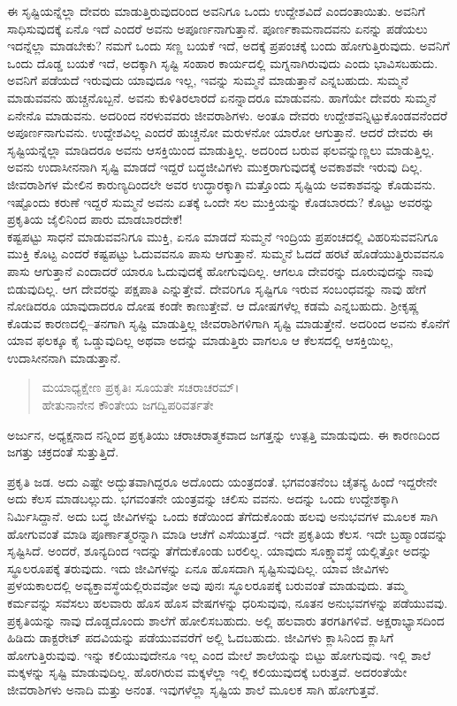 ಈ ಸೃಷ್ಟಿಯನ್ನೆಲ್ಲಾ ದೇವರು ಮಾಡುತ್ತಿರುವುದರಿಂದ ಅವನಿಗೂ ಒಂದು ಉದ್ದೇಶವಿದೆ ಎಂದಂತಾಯಿತು. ಅವನಿಗೆ ಸಾಧಿಸುವುದಕ್ಕೆ ಏನೊ ಇದೆ ಎಂದರೆ ಅವನು ಅಪೂರ್ಣನಾಗುತ್ತಾನೆ. ಪೂರ್ಣಕಾಮನಾದವನು ಏನನ್ನು ಪಡೆಯಲು ಇದನ್ನೆಲ್ಲಾ ಮಾಡಬೇಕು? ನಮಗೆ ಒಂದು ಸಣ್ಣ ಬಯಕೆ ಇದೆ, ಅದಕ್ಕೆ ಪ್ರಪಂಚಕ್ಕೆ ಬಂದು ಹೋಗುತ್ತಿರುವುದು. ಅವನಿಗೆ ಒಂದು ದೊಡ್ಡ ಬಯಕೆ ಇದೆ, ಅದಕ್ಕಾಗಿ ಸೃಷ್ಟಿ ಸಂಹಾರ ಕಾರ್ಯದಲ್ಲಿ ಮಗ್ನನಾಗಿರುವುದು ಎಂದು ಭಾವಿಸಬಹುದು. ಅವನಿಗೆ ಪಡೆಯದೆ ಇರುವುದು ಯಾವುದೂ ಇಲ್ಲ, ಇವನ್ನು ಸುಮ್ಮನೆ ಮಾಡುತ್ತಾನೆ ಎನ್ನಬಹುದು. ಸುಮ್ಮನೆ ಮಾಡುವವನು ಹುಚ್ಚನೊಬ್ಬನೆ. ಅವನು ಕುಳಿತಿರಲಾರದೆ ಏನನ್ನಾದರೂ ಮಾಡುವನು. ಹಾಗೆಯೇ ದೇವರು ಸುಮ್ಮನೆ ಏನೇನೊ ಮಾಡುವನು. ಅದರಿಂದ ನರಳುವವರು ಜೀವರಾಶಿಗಳು. ಅಂತೂ ದೇವರು ಉದ್ದೇಶವನ್ನಿಟ್ಟುಕೊಂಡವನೆಂದರೆ ಅಪೂರ್ಣನಾಗುವನು. ಉದ್ದೇಶವಿಲ್ಲ ಎಂದರೆ ಹುಚ್ಚನೋ ಮರುಳನೋ ಯಾರೋ ಆಗುತ್ತಾನೆ. ಆದರೆ ದೇವರು ಈ ಸೃಷ್ಟಿಯನ್ನೆಲ್ಲಾ ಮಾಡಿದರೂ ಅವನು ಆಸಕ್ತಿಯಿಂದ ಮಾಡುತ್ತಿಲ್ಲ. ಅದರಿಂದ ಬರುವ ಫಲವನ್ನುಣ್ಣಲು ಮಾಡುತ್ತಿಲ್ಲ. ಅವನು ಉದಾಸೀನನಾಗಿ ಸೃಷ್ಟಿ ಮಾಡದೆ ಇದ್ದರೆ ಬದ್ಧಜೀವಿಗಳು ಮುಕ್ತರಾಗುವುದಕ್ಕೆ ಅವಕಾಶವೇ ಇರುವು ದಿಲ್ಲ. ಜೀವರಾಶಿಗಳ ಮೇಲಿನ ಕಾರುಣ್ಯದಿಂದಲೇ ಅವರ ಉದ್ಧಾರಕ್ಕಾಗಿ ಮತ್ತೊಂದು ಸೃಷ್ಟಿಯ ಅವಕಾಶವನ್ನು ಕೊಡುವನು. ಇಷ್ಟೊಂದು ಕರುಣೆ ಇದ್ದರೆ ಸುಮ್ಮನೆ ಅವನು ಏತಕ್ಕೆ ಒಂದೇ ಸಲ ಮುಕ್ತಿಯನ್ನು ಕೊಡಬಾರದು? ಕೊಟ್ಟು ಅವರನ್ನು ಪ್ರಕೃತಿಯ ಜೈಲಿನಿಂದ ಪಾರು ಮಾಡಬಾರದೇಕೆ!\\ಕಷ್ಟಪಟ್ಟು ಸಾಧನೆ ಮಾಡುವವನಿಗೂ ಮುಕ್ತಿ, ಏನೂ ಮಾಡದೆ ಸುಮ್ಮನೆ ಇಂದ್ರಿಯ ಪ್ರಪಂಚದಲ್ಲಿ ವಿಹರಿಸುವವನಿಗೂ ಮುಕ್ತಿ ಕೊಟ್ಟ ಎಂದರೆ ಕಷ್ಟಪಟ್ಟು ಓದುವವನೂ ಪಾಸು ಆಗುತ್ತಾನೆ. ಸುಮ್ಮನೆ ಓದದೆ ಹರಟೆ ಹೊಡೆಯುತ್ತಿರುವವನೂ ಪಾಸು ಆಗುತ್ತಾನೆ ಎಂದಾದರೆ ಯಾರೂ ಓದುವುದಕ್ಕೆ ಹೋಗುವುದಿಲ್ಲ. ಆಗಲೂ ದೇವರನ್ನು ದೂರುವುದನ್ನು ನಾವು ಬಿಡುವುದಿಲ್ಲ. ಆಗ ದೇವರನ್ನು ಪಕ್ಷಪಾತಿ ಎನ್ನುತ್ತೇವೆ. ದೇವರಿಗೂ ಸೃಷ್ಟಿಗೂ ಇರುವ ಸಂಬಂಧವನ್ನು ನಾವು ಹೇಗೆ ನೋಡಿದರೂ ಯಾವುದಾದರೂ ದೋಷ ಕಂಡೇ ಕಾಣುತ್ತೇವೆ. ಆ ದೋಷಗಳೆಲ್ಲ ಕಡಮೆ ಎನ್ನಬಹುದು. ಶ್ರೀಕೃಷ್ಣ ಕೊಡುವ ಕಾರಣದಲ್ಲಿ–ತನಗಾಗಿ ಸೃಷ್ಟಿ ಮಾಡುತ್ತಿಲ್ಲ ಜೀವರಾಶಿಗಳಿಗಾಗಿ ಸೃಷ್ಟಿ ಮಾಡುತ್ತೇನೆ. ಅದರಿಂದ ಅವನು ಕೊನೆಗೆ ಯಾವ ಫಲಕ್ಕೂ ಕೈ ಒಡ್ಡುವುದಿಲ್ಲ ಅಥವಾ ಅದನ್ನು ಮಾಡುತ್ತಿರು ವಾಗಲೂ ಆ ಕೆಲಸದಲ್ಲಿ ಆಸಕ್ತಿಯಿಲ್ಲ, ಉದಾಸೀನನಾಗಿ ಮಾಡುತ್ತಾನೆ.

\begin{verse}
ಮಯಾಧ್ಯಕ್ಷೇಣ ಪ್ರಕೃತಿಃ ಸೂಯತೇ ಸಚರಾಚರಮ್​।\\ಹೇತುನಾನೇನ ಕೌಂತೇಯ ಜಗದ್ವಿಪರಿವರ್ತತೇ 
\end{verse}

{\small ಅರ್ಜುನ, ಅಧ್ಯಕ್ಷನಾದ ನನ್ನಿಂದ ಪ್ರಕೃತಿಯು ಚರಾಚರಾತ್ಮಕವಾದ ಜಗತ್ತನ್ನು ಉತ್ಪತ್ತಿ ಮಾಡುವುದು. ಈ ಕಾರಣದಿಂದ ಜಗತ್ತು ಚಕ್ರದಂತೆ ಸುತ್ತುತ್ತಿದೆ.}

ಪ್ರಕೃತಿ ಜಡ. ಅದು ಎಷ್ಟೇ ಅದ್ಭುತವಾಗಿದ್ದರೂ ಅದೊಂದು ಯಂತ್ರದಂತೆ. ಭಗವಂತನೆಂಬ ಚೈತನ್ಯ ಹಿಂದೆ ಇದ್ದರೇನೇ ಅದು ಕೆಲಸ ಮಾಡಬಲ್ಲುದು. ಭಗವಂತನೇ ಯಂತ್ರವನ್ನು ಚಲಿಸು ವವನು. ಅದನ್ನು ಒಂದು ಉದ್ದೇಶಕ್ಕಾಗಿ ನಿರ್ಮಿಸಿದ್ದಾನೆ. ಅದು ಬದ್ಧ ಜೀವಿಗಳನ್ನು ಒಂದು ಕಡೆಯಿಂದ ತೆಗೆದುಕೊಂಡು ಹಲವು ಅನುಭವಗಳ ಮೂಲಕ ಸಾಗಿ ಹೋಗುವಂತೆ ಮಾಡಿ ಪೂರ್ಣಾತ್ಮರನ್ನಾಗಿ ಮಾಡಿ ಆಚೆಗೆ ಎಸೆಯುತ್ತದೆ. ಇದೇ ಪ್ರಕೃತಿಯ ಕೆಲಸ. ಇದೇ ಬ್ರಹ್ಮಾಂಡವನ್ನು ಸೃಷ್ಟಿಸಿದೆ. ಅಂದರೆ, ಶೂನ್ಯದಿಂದ ಇದನ್ನು ತೆಗೆದುಕೊಂಡು ಬರಲಿಲ್ಲ. ಯಾವುದು ಸೂಕ್ಷ್ಮಾವಸ್ಥೆ ಯಲ್ಲಿತ್ತೋ ಅದನ್ನು ಸ್ಥೂಲರೂಪಕ್ಕೆ ತರುವುದು. ಇದು ಜೀವಿಗಳನ್ನು ಏನೂ ಹೊಸದಾಗಿ ಸೃಷ್ಟಿಸುವುದಿಲ್ಲ. ಯಾವ ಜೀವಿಗಳು ಪ್ರಳಯಕಾಲದಲ್ಲಿ ಅವ್ಯಕ್ತಾವಸ್ಥೆಯಲ್ಲಿರುವವೋ ಅವು ಪುನಃ ಸ್ಥೂಲರೂಪಕ್ಕೆ ಬರುವಂತೆ ಮಾಡುವುದು. ತಮ್ಮ ಕರ್ಮವನ್ನು ಸವೆಸಲು ಹಲವಾರು ಹೊಸ ಹೊಸ ವೇಷಗಳನ್ನು ಧರಿಸುವುವು, ನೂತನ ಅನುಭವಗಳನ್ನು ಪಡೆಯುವವು. ಪ್ರಕೃತಿಯನ್ನು ನಾವು ದೊಡ್ಡದೊಂದು ಶಾಲೆಗೆ ಹೋಲಿಸಬಹುದು. ಅಲ್ಲಿ ಹಲವಾರು ತರಗತಿಗಳಿವೆ. ಅಕ್ಷರಾಭ್ಯಾಸದಿಂದ ಹಿಡಿದು ಡಾಕ್ಟರೇಟ್ ಪದವಿಯನ್ನು ಪಡೆಯುವವರೆಗೆ ಅಲ್ಲಿ ಓದಬಹುದು. ಜೀವಿಗಳು ಕ್ಲಾಸಿನಿಂದ ಕ್ಲಾಸಿಗೆ ಹೋಗುತ್ತಿರುವುವು. ಇನ್ನು ಕಲಿಯುವುದೇನೂ ಇಲ್ಲ ಎಂದ ಮೇಲೆ ಶಾಲೆಯನ್ನು ಬಿಟ್ಟು ಹೋಗುವುವು. ಇಲ್ಲಿ ಶಾಲೆ ಮಕ್ಕಳನ್ನು ಸೃಷ್ಟಿ ಮಾಡುವುದಿಲ್ಲ. ಹೊರಗಿರುವ ಮಕ್ಕಳೆಲ್ಲಾ ಇಲ್ಲಿ ಕಲಿಯುವುದಕ್ಕೆ ಬರುತ್ತವೆ. ಅದರಂತೆಯೇ ಜೀವರಾಶಿಗಳು ಅನಾದಿ ಮತ್ತು ಅನಂತ. ಇವುಗಳೆಲ್ಲಾ ಸೃಷ್ಟಿಯ ಶಾಲೆ ಮೂಲಕ ಸಾಗಿ ಹೋಗುತ್ತವೆ.

